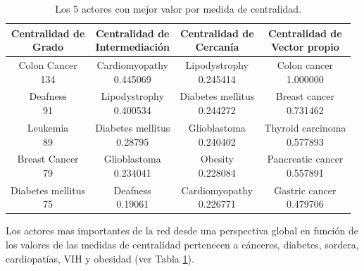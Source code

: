 \documentclass{uimppracticas}
\begin{document}
\begin{table}[H]
	\centering
	\begin{tabular}{ |c|c|c|c| } 
		\hline
		\thead{\textbf{Centralidad de} \\ \textbf{Grado}} & \thead{\textbf{Centralidad de} \\ \textbf{Intermediación}} & 	\thead{\textbf{Centralidad de } \\ \textbf{Cercanía}} & \thead{\textbf{Centralidad de } \\ \textbf{Vector propio}} \\ 
		\hline
		\thead{Colon Cancer \\ 134} & \thead{Cardiomyopathy \\ 0.445069}  & \thead{Lipodystrophy \\ 0.245414} & \thead{Colon cancer \\ 1.000000} \\ 
		\hline
		\thead{Deafness \\ 91} & \thead{Lipodystrophy \\ 0.400534} & \thead{Diabetes mellitus \\ 0.244272} & \thead{Breast cancer \\ 0.731462} \\ 
		\hline
		\thead{Leukemia \\ 89} & \thead{Diabetes mellitus \\ 0.28795} & \thead{Glioblastoma \\ 0.240402} & \thead{Thyroid carcinoma \\ 0.577893} \\ 
		\hline
		\thead{Breast Cancer \\ 79} & \thead{Glioblastoma \\ 0.234041} & \thead{Obesity \\ 0.228084} & \thead{Pancreatic cancer \\ 0.557891} \\ 
		\hline
		\thead{Diabetes mellitus \\ 75} & \thead{Deafness \\ 0.19061} & \thead{Cardiomyopathy \\ 0.226771} & \thead{Gastric cancer \\ 0.479706} \\ 
		\hline 
	\end{tabular}
	\caption{Los 5 actores con mejor valor por medida de centralidad.}
	\label{tabla2}
\end{table}

Los actores mas importantes de la red desde una perspectiva global en función de los valores de las medidas de centralidad pertenecen a cánceres, diabetes, sordera, cardiopatías, VIH y obesidad (ver Tabla \ref{tabla2}). 
\end{document}
